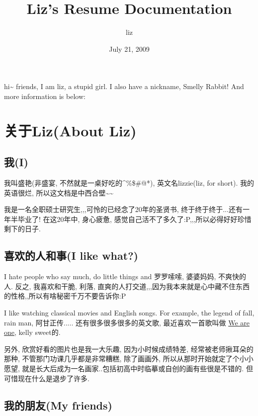 \documentclass[letterpaper,10pt,english]{manual}
\title{Liz's Resume Documentation}
\date{July 21, 2009}
\author{liz}
\begin{document}
\maketitle
\tableofcontents



hi\textasciitilde{} friends, I am liz, a stupid girl. I also have a nickname, Smelly Rabbit!
And more information is below:

\resetcurrentobjects


\chapter{关于Liz(About Liz)}


\section{我(I)}

我叫盛艳(非盛宴, 不然就是一桌好吃的\textasciicircum{}\%\$\#@*), 英文名lizzie(liz, for short). 我的英语很烂, 所以这文档是中西合壁\textasciitilde{}\textasciitilde{}

我是一名全职硕士研究生,,,可怜的已经念了20年的圣贤书, 终于终于终于...还有一年半毕业了! 在这20年中, 身心疲惫, 感觉自己活不了多久了:P,,,所以必得好好珍惜剩下的日子.


\section{喜欢的人和事(I like what?)}

I hate people who say much, do little things and 罗罗嗦嗦, 婆婆妈妈, 不爽快的人. 反之, 我喜欢和干脆, 利落, 直爽的人打交道,,,因为我本来就是心中藏不住东西的性格,,所以有啥秘密千万不要告诉你:P

I like watching classical movies and English songs. For example, the legend of fall, rain man, 阿甘正传..... 还有很多很多很多的英文歌, 最近喜欢一首歌叫做 \href{http://www.youtube.com/watch?v=py6vzbWJsCE}{We are one}, kelly sweet的.

另外, 欣赏好看的图片也是我一大乐趣, 因为小时候成绩特差, 经常被老师揪耳朵的那种, 不管那门功课几乎都是非常糟糕, 除了画画外, 所以从那时开始就定了个小小愿望, 就是长大后成为一名画家..包括初高中时临摹或自创的画有些很是不错的. 但可惜现在什么是退步了许多.


\section{我的朋友(My friends)}
\end{document}
